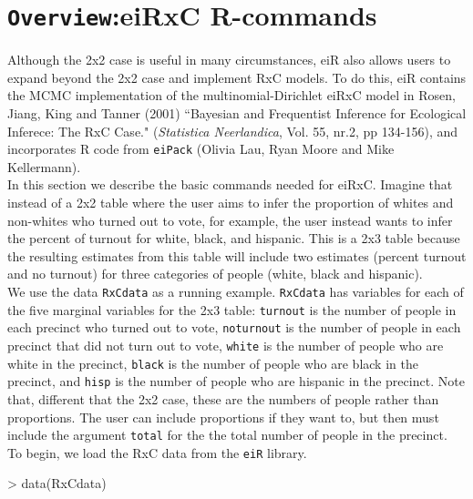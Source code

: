 \documentclass[11pt,oneside,letterpaper,titlepage]{article}
\begin{document}
\section[Overview: eiRxC R-commands]{{\tt Overview}:eiRxC R-commands}

Although the 2x2 case is useful in many circumstances, eiR also allows users to expand beyond the 2x2 case and implement RxC models.  To do this, eiR contains the MCMC implementation of the multinomial-Dirichlet eiRxC model in Rosen, Jiang, King and Tanner (2001) ``Bayesian and Frequentist Inference for Ecological Inferece: The RxC Case." (\emph{Statistica Neerlandica}, Vol. 55, nr.2, pp 134-156), and incorporates R code from \verb#eiPack# (Olivia Lau, Ryan Moore and Mike Kellermann). \\

\noindent In this section we describe the basic commands needed for eiRxC.  Imagine that instead of a 2x2 table where the user aims to infer the proportion of whites and non-whites who turned out to vote, for example, the user instead wants to infer the percent of turnout for white, black, and hispanic.  This is a 2x3 table because the resulting estimates from this table will include two estimates (percent turnout and no turnout) for three categories of people (white, black and hispanic). \\

\noindent We use the data \verb#RxCdata# as a running example.
\verb#RxCdata# has variables for each of the five marginal variables
for the 2x3 table: \verb#turnout# is the number of people in each precinct who turned out to vote, \verb#noturnout# is the number of people in each precinct that did not turn out to vote, \verb#white# is the number of people who are white in the precinct, \verb#black# is the number of people who are black in the precinct, and \verb#hisp# is the number of people who are hispanic in the precinct. Note that, different that the 2x2 case, these are the numbers of people rather than proportions.  The user can include proportions if they want to, but then must include the argument \verb#total# for the the total number of people in the precinct. \\

\noindent To begin, we load the RxC data from the \verb#eiR# library.
\begin{Schunk}
\begin{Sinput}
> data(RxCdata)
\end{Sinput}
\end{Schunk}
\end{document}
